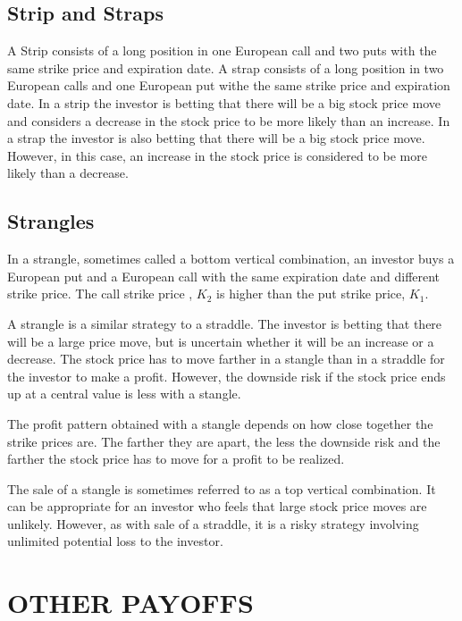 \documentclass{article}
\begin{document}
\subsection{Strip and Straps}
A Strip consists of a long position in one European call and two puts with the same strike price and expiration date. A strap consists of a long position in two European calls and one European put withe the same strike price and expiration date. In a strip the investor is betting that there will be a big stock price move and considers a decrease in the stock price to be more likely than an increase. In a strap the investor is also betting that there will be a big stock price move. However, in this case, an increase in the stock price is considered to be more likely than a decrease.	

\subsection{Strangles}
In a strangle, sometimes called a bottom vertical combination, an investor buys a European put and a European call with the same expiration date and different strike price. The call strike price , $ K_2 $ is higher than the put strike price, $ K_1 $.

A strangle is a similar strategy to a straddle. The investor is betting that there will be a large price move, but is uncertain whether it will be an increase or a decrease. The stock price has to move farther in a stangle than in a straddle for the investor to make a profit. However, the downside risk if the stock price ends up at a central value is less with a stangle.

The profit pattern obtained with a stangle depends on how close together the strike prices are. The farther they are apart, the less the downside risk and the farther the stock price has to move for a profit to be realized.

The sale of a stangle is sometimes referred to as a top vertical combination. It can be appropriate for an investor who feels that large stock price moves are unlikely. However, as with sale of a straddle, it is a risky strategy involving unlimited potential loss to the investor.

\section{OTHER PAYOFFS}
\end{document}
